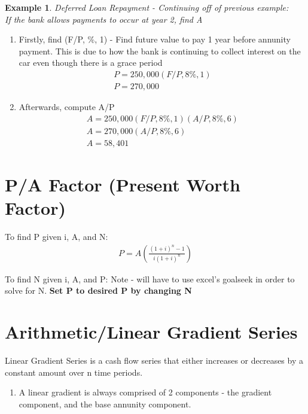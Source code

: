 \documentclass{report} %
\newtheorem{exmp}{Example}
\begin{document}
\begin{exmp}
    Deferred Loan Repayment - Continuing off of previous example: \\
    If the bank allows payments to occur at year 2, find A
\end{exmp}
\begin{enumerate}
    \item Firstly, find (F/P, \%, 1) - Find future value to pay 1 year before annunity payment. This is due to how the bank is continuing to collect interest on the car even though there is a grace period
    \begin{equation*}
        \begin{aligned}
            P = 250,000(F/P, 8\%, 1) \\
            P = 270,000
        \end{aligned}
    \end{equation*}
    \item Afterwards, compute A/P
    \begin{equation*}
        \begin{aligned}
            A = 250,000(F/P, 8\%, 1)(A/P, 8\%, 6) \\
            A = 270,000(A/P, 8\%, 6) \\
            A = 58,401 
        \end{aligned}
    \end{equation*}
\end{enumerate}

\section*{P/A Factor (Present Worth Factor)}
To find P given i, A, and N:
\begin{equation*}
    \begin{aligned}
        P = A\left(\frac{(1+i)^n-1}{i(1+i)^n}\right)
    \end{aligned}
\end{equation*}

To find N given i, A, and P:
Note - will have to use excel's goalseek in order to solve for N. \textbf{Set P to desired P by changing N}

\section*{Arithmetic/Linear Gradient Series}
Linear Gradient Series is a cash flow series that either increases or decreases by a constant amount over n time periods.
\begin{enumerate}
    \item A linear gradient is always comprised of 2 components - the gradient component, and the base annunity component.
\end{enumerate}
\end{document}
